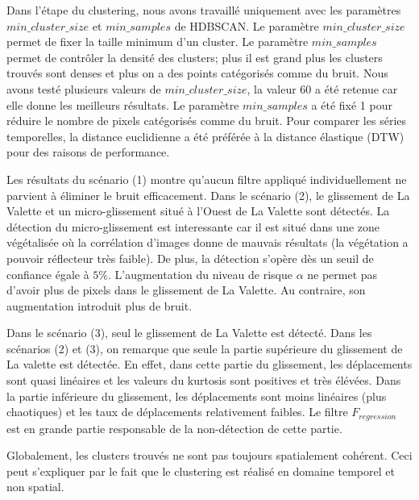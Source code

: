 \documentclass[11pt, openany]{report}
\begin{document}
Dans l’étape du clustering, nous avons travaillé uniquement avec les paramètres $min\_cluster\_size$ et $min\_samples$ de HDBSCAN. Le paramètre $min\_cluster\_size$ permet de fixer la taille minimum d'un cluster. Le paramètre $min\_samples$ permet de contrôler la densité des clusters; plus il est grand plus les clusters trouvés sont denses et plus on a des points catégorisés comme du bruit. Nous avons testé plusieurs valeurs de $min\_cluster\_size$, la valeur 60 a été retenue car elle donne les meilleurs résultats. Le paramètre  $min\_samples$ a été fixé 1 pour réduire le nombre de pixels catégorisés comme du bruit. Pour comparer les séries temporelles, la distance euclidienne a été préférée à la distance élastique (DTW) pour des raisons de performance.

Les résultats du scénario (1) montre qu'aucun filtre appliqué individuellement ne parvient à éliminer le bruit efficacement. Dans le scénario (2), le glissement de La Valette et un micro-glissement situé à l'Ouest de La Valette sont détectés. La détection du micro-glissement est interessante car il est situé dans une zone végétalisée où la corrélation d'images donne de mauvais résultats (la végétation a pouvoir réflecteur très faible). De plus, la détection s'opère dès un seuil de confiance égale à $5\%$. L'augmentation du niveau de risque $\alpha$ ne permet pas d'avoir plus de pixels dans le glissement de La Valette. Au contraire, son augmentation introduit plus de bruit.

Dans le scénario (3), seul le glissement de La Valette est détecté. Dans les scénarios (2) et (3), on remarque que seule la partie supérieure du glissement de La valette est détectée. En effet, dans cette partie du glissement, les déplacements sont quasi linéaires et les valeurs du kurtosis sont positives et très élévées. Dans la partie inférieure du glissement, les déplacements sont moins linéaires (plus chaotiques) et les taux de déplacements relativement faibles. Le filtre $F_{regression}$ est en grande partie responsable de la non-détection de cette partie.

Globalement, les clusters trouvés ne sont pas toujours spatialement cohérent. Ceci peut s'expliquer par le fait que le clustering est réalisé en domaine temporel et non spatial.
\end{document}
